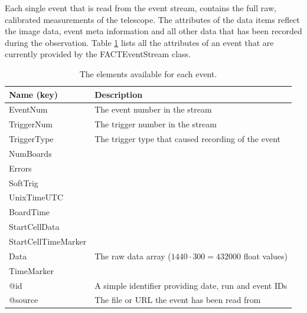 Each single event that is read from the event stream, contains the
full raw, calibrated measurements of the telescope. 
The attributes of the data items reflect the image data, event
meta information and all other data that has been recorded during the
observation. Table \ref{tab:factEventKeys} lists all the attributes of
an event that are currently provided by the {\ttfamily FACTEventStream}
class.
\begin{table}[h!]
\renewcommand{\arraystretch}{1.25}
{\footnotesize
  \begin{center}
    \begin{tabular}{l|l} \hline
      \textsf{\textbf{Name (key)}} & \textsf{\textbf{Description}} \\ \hline \hline
      {\ttfamily EventNum} & The event number in the stream \\ \hline
      {\ttfamily TriggerNum} & The trigger number in the stream \\ \hline
      {\ttfamily TriggerType} & The trigger type that caused recording of the event \\ \hline
      {\ttfamily NumBoards} & \\ \hline
      {\ttfamily Errors} & \\ \hline
      {\ttfamily SoftTrig} & \\ \hline
      {\ttfamily UnixTimeUTC} & \\ \hline
      {\ttfamily BoardTime} & \\ \hline
      {\ttfamily StartCellData} & \\ \hline
      {\ttfamily StartCellTimeMarker} & \\ \hline
      {\ttfamily Data} & The raw data array ($1440\cdot 300 = 432000$ float values) \\ \hline
      {\ttfamily TimeMarker} & \\ \hline
      {\ttfamily @id} & A simple identifier providing date, run and event IDs \\ \hline
      {\ttfamily @source} & The file or URL the event has been read from \\ \hline
    \end{tabular}
  \end{center}}
  \caption{\label{tab:factEventKeys} The elements available for each event.}
\end{table}

